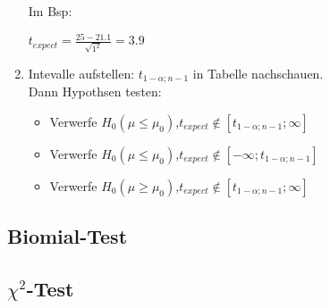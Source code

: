 \documentclass[a4paper, 11pt]{article}
\begin{document}
\begin{enumerate}
     Im Bsp:

     $ t_{expect} = \frac{ 25 - 21.1} { \sqrt{1^2}} = 3.9$
   \item Intevalle aufstellen:
     $t_{1-\alpha; n-1}$ in Tabelle nachschauen.\\

     Dann Hypothsen testen:\\

     \begin {itemize}
       \item Verwerfe $ H_0(\mu \leq \mu_0)$,$ t_{expect} \notin [t_{1-\alpha; n-1}; \infty]$ 
       \item Verwerfe $ H_0(\mu \leq \mu_0)$,$ t_{expect} \notin [- \infty; t_{1-\alpha; n-1}]$ 
       \item Verwerfe $ H_0(\mu \geq \mu_0)$,$ t_{expect} \notin [t_{1-\alpha; n-1}; \infty]$ 
     \end{itemize}

\end{enumerate}
\subsection{Biomial-Test}
\subsection{$\chi^2$-Test}
\end{document}
